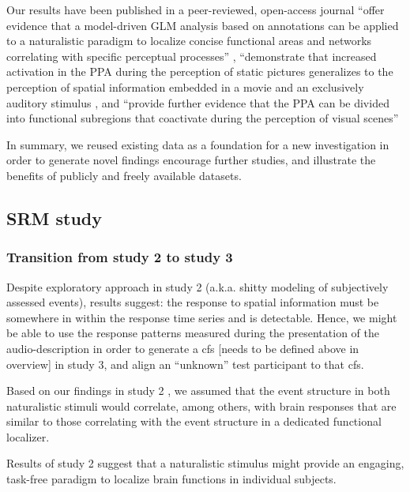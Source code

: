 
Our results have been published in a peer-reviewed, open-access journal
%
``offer evidence that a model-driven GLM analysis based on annotations can be
applied to a naturalistic paradigm to localize concise functional areas and
networks correlating with specific perceptual processes''
\citep{haeusler2022processing},
%
``demonstrate that increased activation in the PPA during the perception of
static pictures generalizes to the perception of spatial information embedded in
a movie and an exclusively auditory stimulus \citep{haeusler2022processing}, and
%
``provide further evidence that the PPA can be divided into functional
subregions that coactivate during the perception of visual scenes''
\citep{haeusler2022processing}

In summary, we reused existing data as a foundation for a new investigation in
order to generate novel findings encourage further studies, and illustrate the
benefits of publicly and freely available datasets.


\subsection{SRM study}


\subsubsection{Transition from study 2 to study 3}
%
Despite exploratory approach in study 2 (a.k.a. shitty modeling of subjectively
assessed events), results suggest:
%
the response to spatial information must be somewhere in within the response
time series and is detectable.
%
Hence, we might be able to use the response patterns measured during the
presentation of the audio-description in order to generate a \ac{cfs} [needs to
be defined above in overview] in study 3, and align an ``unknown'' test
participant to that \ac{cfs}.

Based on our findings in study 2 \citep{haeusler2022processing}, we assumed that
the event structure in both naturalistic stimuli would correlate, among others,
with brain responses that are similar to those correlating with the event
structure in a dedicated functional localizer.

Results of study 2 suggest that a naturalistic stimulus might provide an
engaging, task-free paradigm to localize brain functions in individual subjects.


